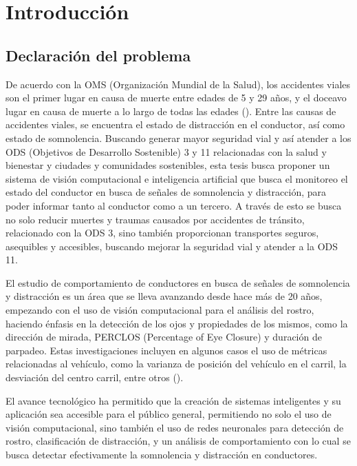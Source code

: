 %
\chapter{Introducción}
\label{ch::capitulo1}

\section{Declaración del problema}
De acuerdo con la OMS (Organización Mundial de la Salud), los accidentes viales son el primer lugar en causa de muerte entre edades de 5 y 29 años, y el doceavo lugar en causa de muerte a lo largo de todas las edades (\cite{OMS}). Entre las causas de accidentes viales, se encuentra el estado de distracción en el conductor, así como estado de somnolencia. Buscando generar mayor seguridad vial y así atender a los ODS (Objetivos de Desarrollo Sostenible) 3 y 11 relacionadas con la salud y bienestar y ciudades y comunidades sostenibles, esta tesis busca proponer un sistema de visión computacional e inteligencia artificial que busca el monitoreo el estado del conductor en busca de señales de somnolencia y distracción, para poder informar tanto al conductor como a un tercero. A través de esto se busca no solo reducir muertes y traumas causados por accidentes de tránsito, relacionado con la ODS 3, sino también proporcionan transportes seguros, asequibles y accesibles, buscando mejorar la seguridad vial y atender a la ODS 11. 

El estudio de comportamiento de conductores en busca de señales de somnolencia y distracción es un área que se lleva avanzando desde hace más de 20 años, empezando con el uso de visión computacional para el análisis del rostro, haciendo énfasis en la detección de los ojos y propiedades de los mismos, como la dirección de mirada, PERCLOS (Percentage of Eye Closure) y duración de parpadeo. Estas investigaciones incluyen en algunos casos el uso de métricas relacionadas al vehículo, como la varianza de posición del vehículo en el carril, la desviación del centro carril, entre otros (\cite{LibroPERCLOS}).

El avance tecnológico ha permitido que la creación de sistemas inteligentes y su aplicación sea accesible para el público general, permitiendo no solo el uso de visión computacional, sino también el uso de redes neuronales para detección de rostro, clasificación de distracción, y un análisis de comportamiento con lo cual se busca detectar efectivamente la somnolencia y distracción en conductores. 

